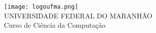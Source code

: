 \documentclass[
12pt,       %
openright,      %
oneside,      %
a4paper,      %
english,      %
french,       %
spanish,      %
brazil        %
]{abntex2}
\begin{document}
\frenchspacing 



\renewcommand{\imprimircapa}{%
\begin{capa}%
\center
\texttt{[image: logoufma.png]} \\ 
\vspace{1cm}
\ABNTEXchapterfont\Large UNIVERSIDADE FEDERAL DO MARANHÃO \\
\ABNTEXsectionfont\Large Curso de Ciência da Computação \\

\vspace*{5cm}

\begin{center}
{\ABNTEXsectionfont\Large\imprimirautor} \\
\vfill
\ABNTEXchapterfont\bfseries\LARGE\imprimirtitulo
\end{center}
\vfill
\large\imprimirlocal \\
\large\imprimirdata
\vspace*{1cm}
\end{capa}
} 

\imprimircapa


\imprimirfolhaderosto



%


\end{document}
